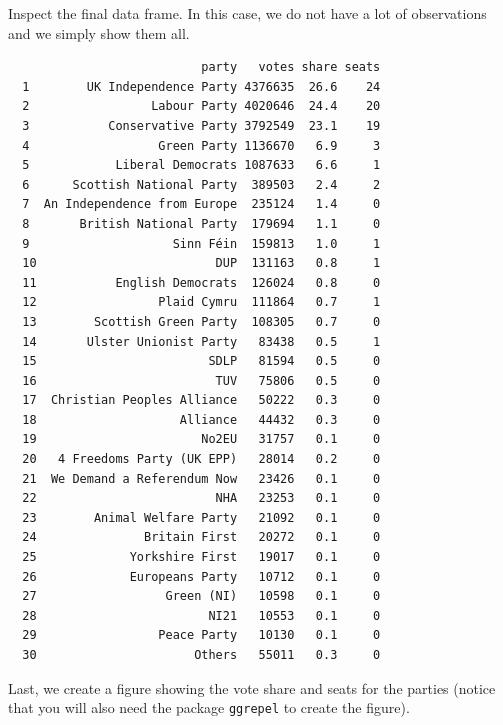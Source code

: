 \documentclass[12pt,oneside]{reedthesis}
\theoremstyle{definition}
\theoremstyle{definition}
\theoremstyle{definition}
\theoremstyle{remark}
\begin{document}
  Inspect the final data frame. In this case, we do not have a lot of
  observations and we simply show them all.
  \begin{Shaded}
  \begin{Highlighting}[]
  \end{Highlighting}
  \end{Shaded}
  \begin{verbatim}
                           party   votes share seats
  1        UK Independence Party 4376635  26.6    24
  2                 Labour Party 4020646  24.4    20
  3           Conservative Party 3792549  23.1    19
  4                  Green Party 1136670   6.9     3
  5            Liberal Democrats 1087633   6.6     1
  6      Scottish National Party  389503   2.4     2
  7  An Independence from Europe  235124   1.4     0
  8       British National Party  179694   1.1     0
  9                    Sinn Féin  159813   1.0     1
  10                         DUP  131163   0.8     1
  11           English Democrats  126024   0.8     0
  12                 Plaid Cymru  111864   0.7     1
  13        Scottish Green Party  108305   0.7     0
  14       Ulster Unionist Party   83438   0.5     1
  15                        SDLP   81594   0.5     0
  16                         TUV   75806   0.5     0
  17  Christian Peoples Alliance   50222   0.3     0
  18                    Alliance   44432   0.3     0
  19                       No2EU   31757   0.1     0
  20   4 Freedoms Party (UK EPP)   28014   0.2     0
  21  We Demand a Referendum Now   23426   0.1     0
  22                         NHA   23253   0.1     0
  23        Animal Welfare Party   21092   0.1     0
  24               Britain First   20272   0.1     0
  25             Yorkshire First   19017   0.1     0
  26             Europeans Party   10712   0.1     0
  27                  Green (NI)   10598   0.1     0
  28                        NI21   10553   0.1     0
  29                 Peace Party   10130   0.1     0
  30                      Others   55011   0.3     0
  \end{verbatim}
  Last, we create a figure showing the vote share and seats for the
  parties (notice that you will also need the package \texttt{ggrepel} to
  create the figure).
\end{document}
